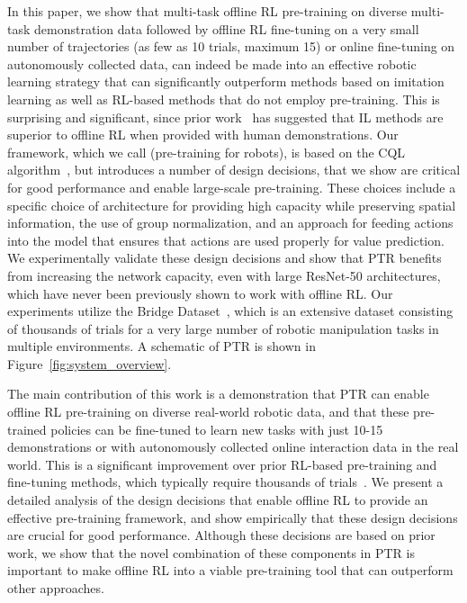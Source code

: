 In this paper, we show that multi-task offline RL pre-training on diverse multi-task demonstration data followed by offline RL fine-tuning on a very small number of trajectories (as few as 10 trials, maximum 15) or online fine-tuning on autonomously collected data, can indeed be made into an effective robotic learning strategy that can significantly outperform methods based on imitation learning as well as RL-based methods that do not employ pre-training. This is surprising and significant, since prior work~\citep{mandlekar2021what} has suggested that IL methods are superior to offline RL when provided with human demonstrations. Our framework, which we call \ptrmethodname (pre-training for robots), is based on the CQL algorithm~\citep{kumar2020conservative}, but introduces a number of design decisions, that we show are critical for good performance and enable large-scale pre-training. These choices include a specific choice of architecture for providing high capacity while preserving spatial information, the use of group normalization, and an approach for feeding actions into the model that ensures that actions are used properly for value prediction. We experimentally validate these design decisions and show that PTR benefits from increasing the network capacity, even with large ResNet-50 architectures, which have never been previously shown to work with offline RL. Our experiments utilize the Bridge Dataset~\citep{ebert2021bridge}, which is an extensive dataset consisting of thousands of trials for a very large number of robotic manipulation tasks in multiple environments. A schematic of PTR is shown in Figure~\ref{fig:system_overview}. 

The main contribution of this work is a demonstration that PTR can enable offline RL pre-training on diverse real-world robotic data, and that these pre-trained policies can be fine-tuned to learn new tasks with just 10-15 demonstrations or with autonomously collected online interaction data in the real world. 
This is a significant improvement over prior RL-based pre-training and fine-tuning methods, which typically require thousands of trials~\citep{singh2020cog,kalashnikov2021mt,julian2020never,chebotar2021actionable,lee2022spend}. We present a detailed analysis of the design decisions that enable offline RL to provide an effective pre-training framework, and show empirically that these design decisions are crucial for good performance. {Although these decisions are based on prior work, we show that the novel combination of these components in PTR is important to make offline RL into a viable pre-training tool that can outperform other approaches.}
